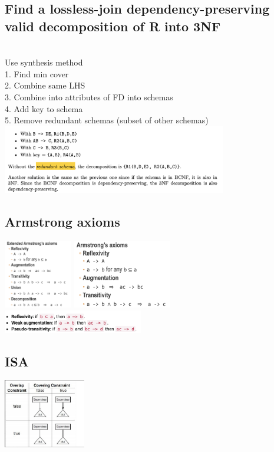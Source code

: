 \documentclass[11pt]{article}
\begin{document}
\begin{multicols*}{3}
\subsection*{Find a lossless-join dependency-preserving valid decomposition of R into 3NF}\\
Use synthesis method\\
1. Find min cover\\
2. Combine same LHS\\
3. Combine into attributes of FD into schemas\\
4. Add key to schema\\
5. Remove redundant schemas (subset of other schemas)\\
\includegraphics[height=3cm]{images/b12}
\subsection*{Armstrong axioms}
\includegraphics[height=3cm]{images/b13}
\includegraphics[height=3cm]{images/b14}\\
 \includegraphics[height=1cm]{images/b16}
\subsection*{ISA}
\includegraphics[height=3cm]{images/b15}

\end{multicols*}
\end{document}
